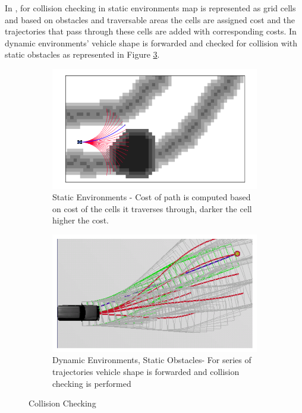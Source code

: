 In \cite{kolski_thesis}, for collision checking in static environments map is represented as grid cells and based on obstacles and traversable areas the cells are assigned cost and the trajectories that pass through these cells are added with corresponding costs. In dynamic environments' vehicle shape is forwarded and checked for collision with static obstacles as represented in Figure \ref{kolskicollison}.
\begin{figure}
	\centering
	\begin{subfigure}{.50\textwidth}
		\centering
		\includegraphics[width=1.0\linewidth]{Images/related_work/kolskistaticobst.png}
		\caption{Static Environments - Cost of path is computed based on cost of the cells it traverses through, darker the cell higher the cost.}
		\label{kolski1}
	\end{subfigure}%
	\begin{subfigure}{.50\textwidth}
		\centering
		\includegraphics[width=1.0\linewidth]{Images/related_work/dynamiccollsionkolski.png}
		\caption{Dynamic Environments, Static Obstacles- For series of trajectories vehicle shape is forwarded and collision checking is performed}
		\label{kolski2}
	\end{subfigure}
	\caption{Collision Checking \cite{kolski_thesis}}
	\label{kolskicollison}
\end{figure}

